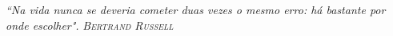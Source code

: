 \begin{epigrafe}
\hypertarget{estilo:epigrafe}{}
\textit{\large``Na vida nunca se deveria cometer duas vezes o mesmo erro: há bastante por onde escolher".}
\vspace{1cm}
\hspace{4cm} \emph{\textsc{Bertrand Russell}}
\end{epigrafe}
